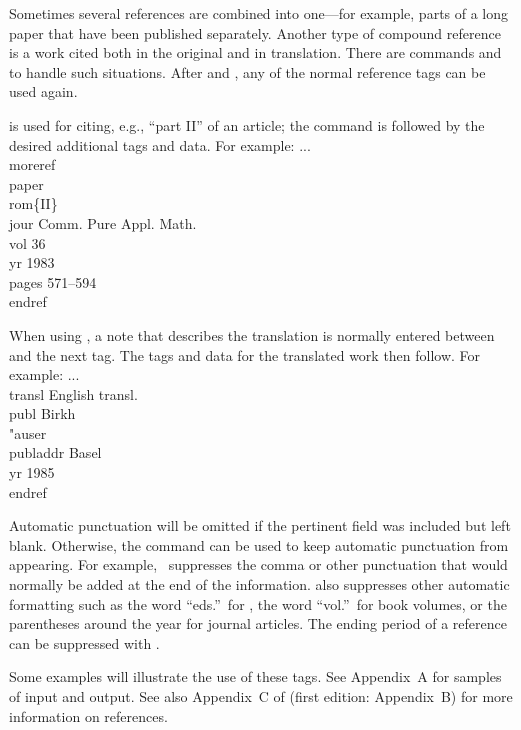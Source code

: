Sometimes several references are combined into one---for example, parts
of a long paper that have been published separately.  Another type of
compound reference is a work cited both in the original and in
translation.  There are commands  and  to handle
such situations.  After  and , any of the normal
reference tags can be used again.

 is used for citing, e.g., ``part II'' of an article; the
 command is followed by the desired additional tags and
data.  For example:
\beginexample{}
...\\moreref\\paper\\rom\{II\}
\\jour Comm. Pure Appl. Math. \\vol 36
\\yr 1983 \\pages 571--594\\endref
\endexample

When using , a note  that describes the translation is
normally entered between  and the next tag. The tags and data
for the translated work then follow. For example:
\beginexample{}
...\\transl English transl. \\publ Birkh\\"auser
\\publaddr Basel \\yr 1985 \\endref
\endexample

Automatic punctuation will be omitted if the pertinent field was
included but left blank.  Otherwise, the command  can be
used to keep automatic punctuation from appearing.  For example,
\ suppresses the comma or other punctuation
that would normally be added at the end of the 
information.  also suppresses other automatic formatting
such as the word ``eds.''\ for , the word ``vol.''\ for book volumes,
or the parentheses around the year for journal articles. The ending
period of a reference can be suppressed with
.

Some examples will illustrate the use of these tags.  See Appendix~A for
samples of input and output. See also Appendix~C of \JoT{} (first
edition: Appendix~B) for more information on references.



